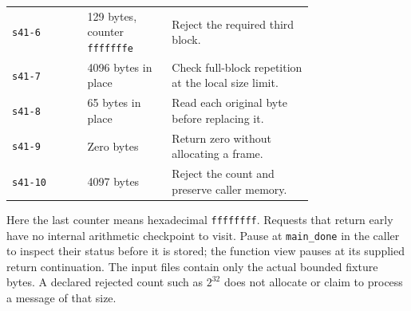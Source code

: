\begin{longtable}{lp{0.28\linewidth}p{0.47\linewidth}}
  \texttt{s41-6}  & 129 bytes, counter \texttt{fffffffe} & Reject the required third block.                      \\
  \texttt{s41-7}  & 4096 bytes in place                  & Check full-block repetition at the local size limit.  \\
  \texttt{s41-8}  & 65 bytes in place                    & Read each original byte before replacing it.          \\
  \texttt{s41-9}  & Zero bytes                           & Return zero without allocating a frame.               \\
  \texttt{s41-10} & 4097 bytes                           & Reject the count and preserve caller memory.          \\
  \bottomrule
\end{longtable}

Here the last counter means hexadecimal \texttt{ffffffff}. Requests that return
early have no internal arithmetic checkpoint to visit. Pause at \texttt{main\_done}
in the caller to inspect their status before it is stored; the function view pauses
at its supplied return continuation. The input files contain only the actual bounded
fixture bytes. A declared rejected count such as \(2^{32}\) does not allocate or
claim to process a message of that size.
